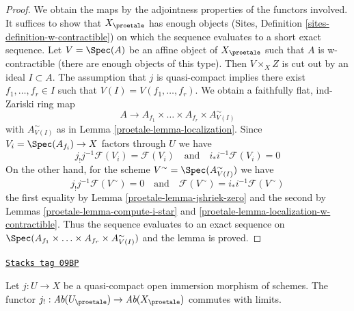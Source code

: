 \begin{proof}

We obtain the maps by the adjointness properties of the functors involved.
It suffices to show that $X_\proetale$ has enough objects
(Sites, Definition \ref{sites-definition-w-contractible}) on which
the sequence evaluates to a short exact sequence.
Let $V = \Spec(A)$ be an affine object of $X_\proetale$
such that $A$ is w-contractible (there are enough objects of this type).
Then $V \times_X Z$ is cut out by an ideal $I \subset A$.
The assumption that $j$ is quasi-compact implies there exist
$f_1, \ldots, f_r \in I$ such that $V(I) = V(f_1, \ldots, f_r)$.
We obtain a faithfully flat, ind-Zariski ring map
$$
A \longrightarrow A_{f_1} \times \ldots \times A_{f_r} \times
A_{V(I)}^\sim
$$
with $A_{V(I)}^\sim$ as in Lemma \ref{proetale-lemma-localization}.
Since $V_i = \Spec(A_{f_i}) \to X$ factors through $U$ we have
$$
j_!j^{-1}\mathcal{F}(V_i) = \mathcal{F}(V_i)
\quad\text{and}\quad
i_*i^{-1}\mathcal{F}(V_i) = 0
$$
On the other hand, for the scheme $V^\sim = \Spec(A_{V(I)}^\sim)$
we have
$$
j_!j^{-1}\mathcal{F}(V^\sim) = 0
\quad\text{and}\quad
\mathcal{F}(V^\sim) = i_*i^{-1}\mathcal{F}(V^\sim)
$$
the first equality by Lemma \ref{proetale-lemma-jshriek-zero}
and the second by
Lemmas \ref{proetale-lemma-compute-i-star} and \ref{proetale-lemma-localization-w-contractible}.
Thus the sequence evaluates to an exact sequence on
$\Spec(A_{f_1} \times \ldots \times A_{f_r} \times A_{V(I)}^\sim)$
and the lemma is proved.
\end{proof}

\begin{lemma}
\label{proetale-lemma-j-shriek-limits}
\href{https://stacks.math.columbia.edu/tag/09BP}{\texttt{Stacks tag 09BP}}

Let $j : U \to X$ be a quasi-compact open immersion
morphism of schemes. The functor
$j_! : \textit{Ab}(U_\proetale) \to \textit{Ab}(X_\proetale)$
commutes with limits.
\end{lemma}

